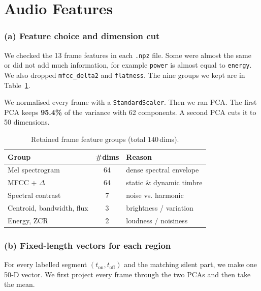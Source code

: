 \documentclass{article}
\begin{document}
\maketitle


\section{Audio Features}

\subsubsection{(a) Feature choice and dimension cut}
We checked the 13 frame features in each \texttt{.npz} file. Some were almost the same or did not add much information, for example \texttt{power} is almost equal to \texttt{energy}. We also dropped \texttt{mfcc\_delta2} and \texttt{flatness}. The nine groups we kept are in Table~\ref{tab:feat}.

We normalised every frame with a \texttt{StandardScaler}. Then we ran PCA. The first PCA keeps \textbf{95.4\%} of the variance with 62 components. A second PCA cuts it to 50 dimensions.

\begin{table}[h]
    \caption{Retained frame feature groups (total $140$\,dims).}
    \label{tab:feat}
    \centering
    \begin{tabular}{lcl}
        \toprule
        Group & \#dims & Reason \\ \midrule
        Mel spectrogram            & 64 & dense spectral envelope \\
        MFCC + $\Delta$            & 64 & static \& dynamic timbre \\
        Spectral contrast          & 7  & noise vs. harmonic      \\
        Centroid, bandwidth, flux  & 3  & brightness / variation   \\
        Energy, ZCR                & 2  & loudness / noisiness     \\ \bottomrule
    \end{tabular}
\end{table}


\subsubsection{(b) Fixed-length vectors for each region}
For every labelled segment $(t_\text{on}, t_\text{off})$ and the matching silent part, we make one 50‑D vector. We first project every frame through the two PCAs and then take the mean.
\end{document}
